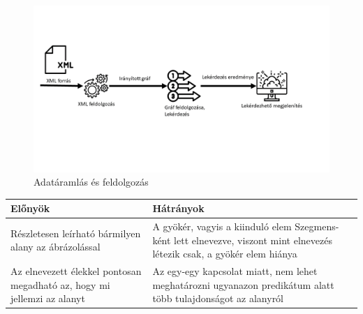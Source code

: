 

\begin{figure}[h]
	\includegraphics[scale=0.45]{images/presentation/data_flow.png}
	\caption{Adatáramlás és feldolgozás}
	\label{fig:flow1}
\end{figure}

\begin{center}
	\begin{tabular}{ |p{7cm}|p{7cm}| }
		\hline
		Előnyök & Hátrányok\\
		\hline
		Részletesen leírható bármilyen alany az ábrázolással & A gyökér, vagyis a kiinduló elem Szegmens-ként lett elnevezve, viszont mint elnevezés létezik csak, a gyökér elem hiánya \\ 
		\hline
		Az elnevezett élekkel pontosan megadható az, hogy mi jellemzi az alanyt & Az egy-egy kapcsolat miatt, nem lehet meghatározni ugyanazon predikátum alatt több tulajdonságot az alanyról\\
		\hline
	\end{tabular}
\end{center}

